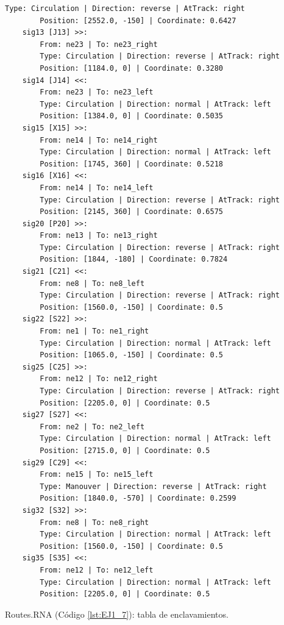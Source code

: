 \begin{lstlisting}[language = {}, caption = Signalling.RNA, label = {lst:EJ1_6}]
		Type: Circulation | Direction: reverse | AtTrack: right 
		Position: [2552.0, -150] | Coordinate: 0.6427
	sig13 [J13] >>:
		From: ne23 | To: ne23_right
		Type: Circulation | Direction: reverse | AtTrack: right 
		Position: [1184.0, 0] | Coordinate: 0.3280
	sig14 [J14] <<:
		From: ne23 | To: ne23_left
		Type: Circulation | Direction: normal | AtTrack: left 
		Position: [1384.0, 0] | Coordinate: 0.5035
	sig15 [X15] >>:
		From: ne14 | To: ne14_right
		Type: Circulation | Direction: normal | AtTrack: left 
		Position: [1745, 360] | Coordinate: 0.5218
	sig16 [X16] <<:
		From: ne14 | To: ne14_left
		Type: Circulation | Direction: reverse | AtTrack: right 
		Position: [2145, 360] | Coordinate: 0.6575
	sig20 [P20] >>:
		From: ne13 | To: ne13_right
		Type: Circulation | Direction: reverse | AtTrack: right 
		Position: [1844, -180] | Coordinate: 0.7824
	sig21 [C21] <<:
		From: ne8 | To: ne8_left
		Type: Circulation | Direction: reverse | AtTrack: right 
		Position: [1560.0, -150] | Coordinate: 0.5
	sig22 [S22] >>:
		From: ne1 | To: ne1_right
		Type: Circulation | Direction: normal | AtTrack: left 
		Position: [1065.0, -150] | Coordinate: 0.5
	sig25 [C25] >>:
		From: ne12 | To: ne12_right
		Type: Circulation | Direction: reverse | AtTrack: right 
		Position: [2205.0, 0] | Coordinate: 0.5
	sig27 [S27] <<:
		From: ne2 | To: ne2_left
		Type: Circulation | Direction: normal | AtTrack: left 
		Position: [2715.0, 0] | Coordinate: 0.5
	sig29 [C29] <<:
		From: ne15 | To: ne15_left
		Type: Manouver | Direction: reverse | AtTrack: right 
		Position: [1840.0, -570] | Coordinate: 0.2599
	sig32 [S32] >>:
		From: ne8 | To: ne8_right
		Type: Circulation | Direction: normal | AtTrack: left 
		Position: [1560.0, -150] | Coordinate: 0.5
	sig35 [S35] <<:
		From: ne12 | To: ne12_left
		Type: Circulation | Direction: normal | AtTrack: left 
		Position: [2205.0, 0] | Coordinate: 0.5
	\end{lstlisting}
	
	Routes.RNA (Código \ref{lst:EJ1_7}): tabla de enclavamientos.
	
